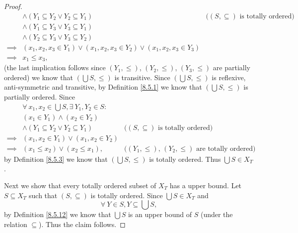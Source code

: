\begin{proof}
\begin{align*}
                 & \land (Y_1 \subseteq Y_2 \lor Y_2 \subseteq Y_1)                                  & \text{(\((S, \subseteq)\) is totally ordered)} \\
                 & \land (Y_1 \subseteq Y_3 \lor Y_3 \subseteq Y_1)                                                                                   \\
                 & \land (Y_2 \subseteq Y_3 \lor Y_3 \subseteq Y_2)                                                                                   \\
        \implies & (x_1, x_2, x_3 \in Y_1) \lor (x_1, x_2, x_3 \in Y_2) \lor (x_1, x_2, x_3 \in Y_3)                                                  \\
        \implies & x_1 \leq x_3,
    \end{align*}
    (the last implication follows since \((Y_1, \leq)\), \((Y_2, \leq)\), \((Y_3, \leq)\) are partially ordered)
    we know that \((\bigcup S, \leq)\) is transitive.
    Since \((\bigcup S, \leq)\) is reflexive, anti-symmetric and transitive, by Definition \ref{8.5.1} we know that \((\bigcup S, \leq)\) is partially ordered.
    Since
    \begin{align*}
                 & \forall\ x_1, x_2 \in \bigcup S, \exists\ Y_1, Y_2 \in S :                                                                 \\
                 & (x_1 \in Y_1) \land (x_2 \in Y_2)                                                                                          \\
                 & \land (Y_1 \subseteq Y_2 \lor Y_2 \subseteq Y_1)           & \text{(\((S, \subseteq)\) is totally ordered)}                \\
        \implies & (x_1, x_2 \in Y_1) \lor (x_1, x_2 \in Y_2)                                                                                 \\
        \implies & (x_1 \leq x_2) \lor (x_2 \leq x_1),                        & \text{(\((Y_1, \leq)\), \((Y_2, \leq)\) are totally ordered)}
    \end{align*}
    by Definition \ref{8.5.3} we know that \((\bigcup S, \leq)\) is totally ordered.
    Thus \(\bigcup S \in X_T\).

    Next we show that every totally ordered subset of \(X_T\) has a upper bound.
    Let \(S \subseteq X_T\) such that \((S, \subseteq)\) is totally ordered.
    Since \(\bigcup S \in X_T\) and
    \[
        \forall\ Y \in S, Y \subseteq \bigcup S,
    \]
    by Definition \ref{8.5.12} we know that \(\bigcup S\) is an upper bound of \(S\) (under the relation \(\subseteq\)).
    Thus the claim follows.


\end{proof}
